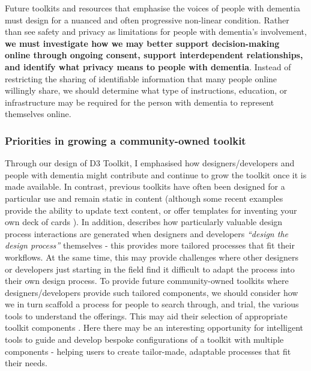 Future toolkits and resources that emphasise the voices of people with dementia must design for a nuanced and often progressive non-linear condition. Rather than see safety and privacy as limitations for people with dementia's involvement, \textbf{we must investigate how we may better support decision-making online through ongoing consent, support interdependent relationships, and identify what privacy means to people with dementia}. Instead of restricting the sharing of identifiable information that many people online willingly share, we should determine what type of instructions, education, or infrastructure may be required for the person with dementia to represent themselves online. 

\subsubsection{Priorities in growing a community-owned toolkit}
Through our design of D3 Toolkit, I emphasised how designers/developers and people with dementia might contribute and continue to grow the toolkit once it is made available. In contrast, previous toolkits have often been designed for a particular use and remain static in content (although some recent examples provide the ability to update text content, or offer templates for inventing your own deck of cards \citep{garcia2019designing,mora2017tiles}). In addition, \cite{mose2017understanding} describes how particularly valuable design process interactions are generated when designers and developers \textit{``design the design process''} themselves - this provides more tailored processes that fit their workflows. At the same time, this may provide challenges where other designers or developers just starting in the field find it difficult to adapt the process into their own design process. To provide future community-owned toolkits where designers/developers provide such tailored components, we should consider how we in turn scaffold a process for people to search through, and trial, the various tools to understand the offerings. This may aid their selection of appropriate toolkit components \citep{lee2021landscape}. Here there may be an interesting opportunity for intelligent tools to guide and develop bespoke configurations of a toolkit with multiple components - helping users to create tailor-made, adaptable processes that fit their needs. 

